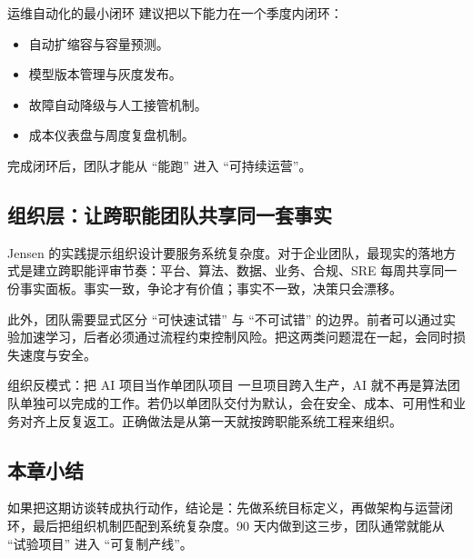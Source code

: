 \begin{knowledgebox}{运维自动化的最小闭环}
建议把以下能力在一个季度内闭环：
\begin{itemize}
    \item 自动扩缩容与容量预测。
    \item 模型版本管理与灰度发布。
    \item 故障自动降级与人工接管机制。
    \item 成本仪表盘与周度复盘机制。
\end{itemize}
完成闭环后，团队才能从 ``能跑'' 进入 ``可持续运营''。
\end{knowledgebox}

\subsection{组织层：让跨职能团队共享同一套事实}

Jensen 的实践提示组织设计要服务系统复杂度。对于企业团队，最现实的落地方式是建立跨职能评审节奏：平台、算法、数据、业务、合规、SRE 每周共享同一份事实面板。事实一致，争论才有价值；事实不一致，决策只会漂移。

此外，团队需要显式区分 ``可快速试错'' 与 ``不可试错'' 的边界。前者可以通过实验加速学习，后者必须通过流程约束控制风险。把这两类问题混在一起，会同时损失速度与安全。

\begin{warningbox}{组织反模式：把 AI 项目当作单团队项目}
一旦项目跨入生产，AI 就不再是算法团队单独可以完成的工作。若仍以单团队交付为默认，会在安全、成本、可用性和业务对齐上反复返工。正确做法是从第一天就按跨职能系统工程来组织。
\end{warningbox}

\subsection{本章小结}

如果把这期访谈转成执行动作，结论是：先做系统目标定义，再做架构与运营闭环，最后把组织机制匹配到系统复杂度。90 天内做到这三步，团队通常就能从 ``试验项目'' 进入 ``可复制产线''。

